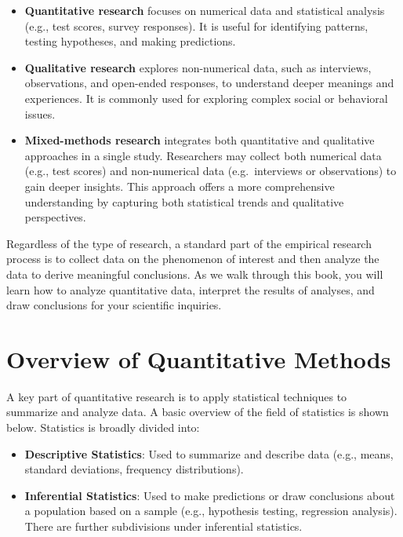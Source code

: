 \documentclass[
  letterpaper,
  DIV=11,
  numbers=noendperiod]{scrreprt}
\begin{document}
\begin{itemize}
\item
  \textbf{Quantitative research} focuses on numerical data and
  statistical analysis (e.g., test scores, survey responses). It is
  useful for identifying patterns, testing hypotheses, and making
  predictions.
\item
  \textbf{Qualitative research} explores non-numerical data, such as
  interviews, observations, and open-ended responses, to understand
  deeper meanings and experiences. It is commonly used for exploring
  complex social or behavioral issues.
\item
  \textbf{Mixed-methods research} integrates both quantitative and
  qualitative approaches in a single study. Researchers may collect both
  numerical data (e.g., test scores) and non-numerical data
  (e.g.~interviews or observations) to gain deeper insights. This
  approach offers a more comprehensive understanding by capturing both
  statistical trends and qualitative perspectives.
\end{itemize}

Regardless of the type of research, a standard part of the empirical
research process is to collect data on the phenomenon of interest and
then analyze the data to derive meaningful conclusions. As we walk
through this book, you will learn how to analyze quantitative data,
interpret the results of analyses, and draw conclusions for your
scientific inquiries.

\section{Overview of Quantitative
Methods}\label{overview-of-quantitative-methods}

A key part of quantitative research is to apply statistical techniques
to summarize and analyze data. A basic overview of the field of
statistics is shown below. Statistics is broadly divided into:

\begin{itemize}
\item
  \textbf{Descriptive Statistics}: Used to summarize and describe data
  (e.g., means, standard deviations, frequency distributions).
\item
  \textbf{Inferential Statistics}: Used to make predictions or draw
  conclusions about a population based on a sample (e.g., hypothesis
  testing, regression analysis). There are further subdivisions under
  inferential statistics.
\end{itemize}
\end{document}
